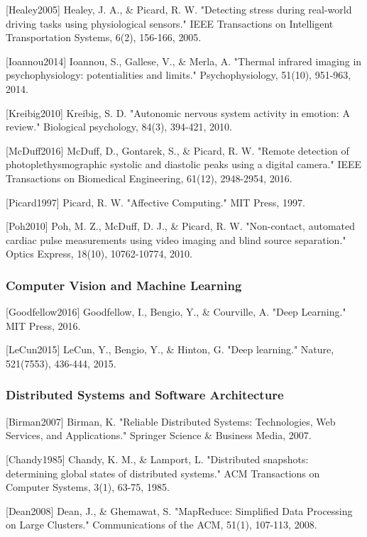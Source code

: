 \documentclass[12pt,a4paper]{report}
\begin{document}
{{[Healey2005] Healey, J. A., \& Picard, R. W. "Detecting stress during real-world driving tasks using physiological
sensors." IEEE Transactions on Intelligent Transportation Systems, 6(2), 156-166, 2005.

[Ioannou2014] Ioannou, S., Gallese, V., \& Merla, A. "Thermal infrared imaging in psychophysiology: potentialities and
limits." Psychophysiology, 51(10), 951-963, 2014.

[Kreibig2010] Kreibig, S. D. "Autonomic nervous system activity in emotion: A review." Biological psychology, 84(3),
394-421, 2010.

[McDuff2016] McDuff, D., Gontarek, S., \& Picard, R. W. "Remote detection of photoplethysmographic systolic and diastolic
peaks using a digital camera." IEEE Transactions on Biomedical Engineering, 61(12), 2948-2954, 2016.

[Picard1997] Picard, R. W. "Affective Computing." MIT Press, 1997.

[Poh2010] Poh, M. Z., McDuff, D. J., \& Picard, R. W. "Non-contact, automated cardiac pulse measurements using video
imaging and blind source separation." Optics Express, 18(10), 10762-10774, 2010.

\subsubsection{Computer Vision and Machine Learning}

[Goodfellow2016] Goodfellow, I., Bengio, Y., \& Courville, A. "Deep Learning." MIT Press, 2016.

[LeCun2015] LeCun, Y., Bengio, Y., \& Hinton, G. "Deep learning." Nature, 521(7553), 436-444, 2015.

\subsubsection{Distributed Systems and Software Architecture}

[Birman2007] Birman, K. "Reliable Distributed Systems: Technologies, Web Services, and Applications." Springer Science \&
Business Media, 2007.

[Chandy1985] Chandy, K. M., \& Lamport, L. "Distributed snapshots: determining global states of distributed systems." ACM
Transactions on Computer Systems, 3(1), 63-75, 1985.

[Dean2008] Dean, J., \& Ghemawat, S. "MapReduce: Simplified Data Processing on Large Clusters." Communications of the
ACM, 51(1), 107-113, 2008.

}}
\end{document}
